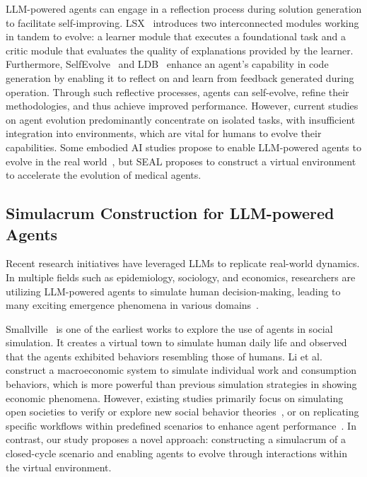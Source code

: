 \documentclass[fleqn,12pt]{wlscirep}
\begin{document}
LLM-powered agents can engage in a reflection process during solution generation to facilitate self-improving. LSX~\cite{stammer2023learning} introduces two interconnected modules working in tandem to evolve: a learner module that executes a foundational task and a critic module that evaluates the quality of explanations provided by the learner. Furthermore, SelfEvolve~\cite{jiang2023selfevolve} and LDB~\cite{ zhong2024ldb} enhance an agent’s capability in code generation by enabling it to reflect on and learn from feedback generated during operation. Through such reflective processes, agents can self-evolve, refine their methodologies, and thus achieve improved performance. However, current studies on agent evolution predominantly concentrate on isolated tasks, with insufficient integration into environments, which are vital for humans to evolve their capabilities. Some embodied AI studies propose to enable LLM-powered agents to evolve in the real world~\cite{bovo2024embardiment}, but SEAL proposes to construct a virtual environment to accelerate the evolution of medical agents.

\subsection*{Simulacrum Construction for LLM-powered Agents}
Recent research initiatives have leveraged LLMs to replicate real-world dynamics. In multiple fields such as epidemiology, sociology, and economics, researchers are utilizing LLM-powered agents to simulate human decision-making, leading to many exciting emergence phenomena
in various domains~\cite{mou2024individual}.

Smallville~\cite{Park:23:Smallville} is one of the earliest works to explore the use of agents in social simulation. It creates a virtual town to simulate human daily life and observed that the agents exhibited behaviors resembling those of humans. 
Li et al.~\cite{li2024econagent}  construct a macroeconomic system to simulate individual work and consumption behaviors, which is more powerful than previous simulation strategies in showing economic phenomena.
However, existing studies primarily focus on simulating open societies to verify or explore new social behavior theories~\cite{chawla2023selfish, li2023camel}, or on replicating specific workflows within predefined scenarios to enhance agent performance~\cite{qian2024chatdev, chen2023agentverse}. In contrast, our study proposes a novel approach: constructing a simulacrum of a closed-cycle scenario and enabling agents to evolve through interactions within the virtual environment. 
\end{document}
